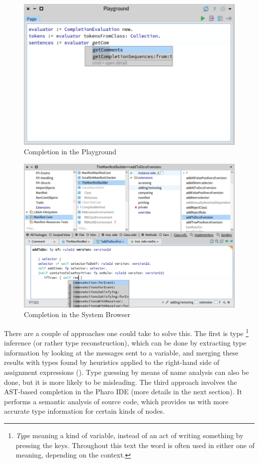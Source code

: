 \begin{figure}[H]
    \centering
    \includegraphics[width=0.9\linewidth]{images/completion1.png}
    \caption{Completion in the Playground}
    \label{fig:playground}
\end{figure}

\begin{figure}[H]
    \centering
    \includegraphics[width=0.9\linewidth]{images/completion2.png}
    \caption{Completion in the System Browser}
    \label{fig:editor}
\end{figure}

There are a couple of approaches one could take to solve this. The first is type \footnote{\textit{Type} meaning a kind of variable, instead of an act of writing something by pressing the keys. Throughout this text the word is often used in either one of meaning, depending on the context.} inference (or rather type reconstruction), which can be done by extracting type information by looking at the messages sent to a variable, and merging these results with types found by heuristics applied to the right-hand side of assignment expressions (\cite{Pluq09a}). Type guessing by means of name analysis can also be done, but it is more likely to be misleading. The third approach involves the AST-based completion in the Pharo IDE (more details in the next section). It performs a semantic analysis of source code, which provides us with more accurate type information for certain kinds of nodes.

